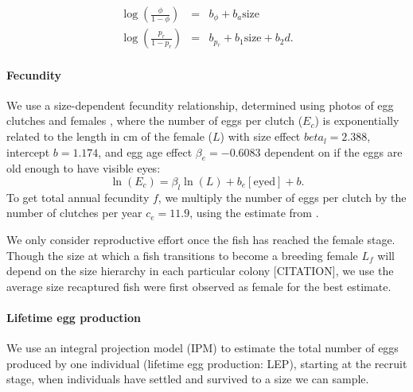 \documentclass[12pt, oneside]{article}   	%
\begin{document}
\begin{eqnarray}
\log(\frac{\phi}{1-\phi}) &=& b_\phi + b_a\text{size} \\
\log(\frac{p_r}{1-p_r}) &=& b_{p_r} + b_1\text{size} + b_2d. \label{EQN_Survival}
\end{eqnarray}

\paragraph*{Fecundity}

We use a size-dependent fecundity relationship, determined using photos of egg clutches and females \citep{yawdoszynInPrepfecundity}, where the number of eggs per clutch ($E_c$) is exponentially related to the length in cm of the female ($L$) with size effect $beta_l = 2.388$, intercept $b = 1.174$, and egg age effect $\beta_e = -0.6083$ dependent on if the eggs are old enough to have visible eyes: 
\begin{equation} %
\ln(E_c) = \beta_l\ln(L) + b_e[\text{eyed}] + b. \label{EQN_Fec}
\end{equation}
To get total annual fecundity $f$, we multiply the number of eggs per clutch by the number of clutches per year $c_e = 11.9$, using the estimate from \cite{holtswarth2017fecundity}.

We only consider reproductive effort once the fish has reached the female stage. Though the size at which a fish transitions to become a breeding female $L_f$ will depend on the size hierarchy in each particular colony [CITATION], we use the average size recaptured fish were first observed as female for the best estimate. 


\paragraph*{Lifetime egg production}
We use an integral projection model (IPM) \citep[e.g.][]{rees2014building} to estimate the total number of eggs produced by one individual (lifetime egg production: LEP), starting at the recruit stage, when individuals have settled and survived to a size we can sample.
\end{document}
